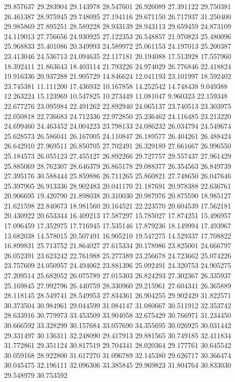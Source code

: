 29.857637
29.283904
29.143978
28.547601
26.926089
27.391122
29.750381
26.461387
28.975945
29.748095
27.194116
29.671150
26.717937
31.250400
29.985869
27.895251
28.589228
28.933139
28.943113
29.659459
24.873109
24.119013
27.756656
24.930925
27.122353
26.548857
21.970823
25.480096
25.968833
25.401086
20.349993
24.589972
25.061153
24.197013
25.200387
23.413046
24.536713
24.094635
22.117181
20.194088
17.513928
17.557960
18.392411
21.863643
18.403114
21.793226
24.974029
26.776846
22.418824
19.916336
20.937288
21.905729
14.846624
12.041193
23.101997
18.592402
23.745381
11.111200
17.436932
10.167858
14.252542
14.748438
9.049388
12.263224
15.123969
10.547825
10.273449
11.081047
9.960323
22.159348
22.677276
23.095984
22.491262
22.892940
24.065137
23.740513
23.303975
22.050818
22.736683
24.712336
22.972850
25.236462
24.116485
23.213220
24.699460
24.463452
24.004223
23.798133
24.086232
26.034794
24.549674
25.628573
26.586041
26.167005
24.110847
26.189577
26.404261
26.488424
26.642910
27.969511
26.850705
27.702491
26.329189
27.661667
26.996550
25.184573
26.055123
27.455127
26.892266
29.727757
29.557437
27.961429
25.885069
28.762307
28.646379
26.865178
29.088377
26.354563
26.849739
27.395176
30.588444
25.859886
26.711265
25.860821
27.748650
26.047646
25.397905
26.913336
28.902483
20.041170
21.187691
20.978388
22.636761
20.906695
19.420790
21.898038
20.310030
20.987976
20.875590
18.985127
21.621598
22.840673
18.981560
20.164521
22.223570
20.604539
17.562181
20.430922
20.653344
16.409213
17.587297
15.785027
17.874251
15.496957
17.096459
17.352975
17.716945
17.535146
17.879236
18.149994
17.493967
13.682038
14.578015
20.507491
16.905210
19.547275
14.529337
17.708822
16.899831
25.713752
21.864027
27.615334
20.178986
23.825001
24.666797
26.052391
23.623242
22.761988
25.277389
23.256678
24.723662
25.074226
23.757609
24.050957
24.494062
23.881396
25.092491
24.320753
24.905275
27.209514
25.682052
26.075789
27.015303
26.824293
27.302367
26.335937
25.169845
27.992796
26.440759
28.330960
29.215961
27.604341
26.365889
28.118145
28.549741
28.549953
27.834361
26.904255
29.902429
31.822571
30.373504
30.984961
29.044599
31.084147
31.080667
30.511912
32.353742
28.633916
30.779973
33.453509
33.904058
32.675429
30.766971
31.234450
30.666592
33.328299
30.157684
33.057690
34.355695
30.026925
30.031442
29.331497
30.136311
32.248090
29.417913
29.881565
30.749185
32.411834
31.772861
29.351124
30.817519
29.704341
28.020364
29.177761
30.645542
30.059168
28.922800
31.617270
31.096789
32.145380
29.626717
30.366474
30.045475
32.196111
32.096306
33.385845
29.969823
31.804764
30.833030
29.548979
30.753592
